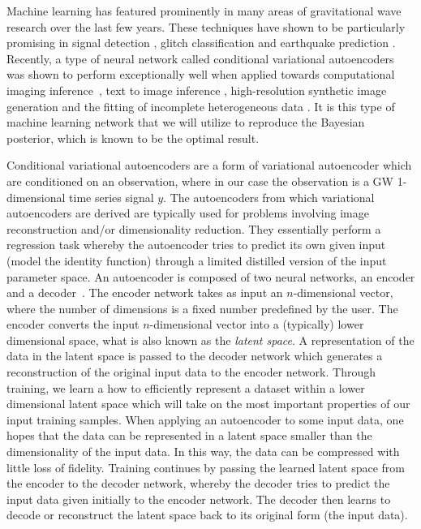 \documentclass[%
showpacs,
 amsmath,amssymb,
 aps,
 twocolumn,
 prl,
 reprint,
floatfix,
]{revtex4-1}
\begin{document}
%
%
Machine learning has featured prominently in many areas of gravitational wave
research over the last few years. These techniques have shown to be
particularly promising in signal detection
\cite{GEORGE201864,PhysRevLett.120.141103,1904.08693}, glitch classification
\cite{1706.07446,0264-9381-34-6-064003} and earthquake prediction
\cite{Coughlin_2017}. Recently, a type of neural network called conditional
variational autoencoders was shown to perform exceptionally well when applied
towards computational imaging inference~\cite{1904.06264,NIPS2015_5775}, text
to image inference \cite{1512.00570}, high-resolution synthetic image
generation \cite{1612.00005} and the fitting of incomplete heterogeneous data
\cite{1807.03653}. It is this type of machine learning network that 
we will utilize to reproduce the Bayesian posterior, which is known to be 
the optimal result.

%
%
Conditional variational autoencoders are a form of variational autoencoder
which are conditioned on an observation, where in our case the observation is a
\ac{GW} 1-dimensional time series signal $y$. The autoencoders from which
variational autoencoders are derived are typically used for problems involving
image reconstruction and/or dimensionality reduction. They essentially perform
a regression task whereby the autoencoder tries to predict its own given input
(model the identity function) through a limited distilled version of the input 
parameter space. An autoencoder is composed of two neural networks, an encoder and a decoder~\cite{LIOU20083150}. The encoder network takes as input an
$n$-dimensional vector, where the number of dimensions is a fixed number
predefined by the user. The encoder converts the input $n$-dimensional vector into a (typically) lower dimensional space, what is also known as the {\it{latent space}}. A
representation of the data in the latent space is passed to the decoder network
which generates a reconstruction of the original input data to the encoder
network. Through training, we learn a how to efficiently represent 
a dataset within a lower dimensional latent space which will take on the most important properties of our input training samples. When applying an autoencoder to some
input data, one hopes that the data can be represented in a latent space
smaller than the dimensionality of the input data.  In this way, the data can
be compressed with little loss of fidelity. Training continues by passing 
the learned latent space from the encoder to the decoder network, 
whereby the decoder tries to predict the input data given initially 
to the encoder network. The decoder then learns to decode or reconstruct the latent space back to its original form (the input data). 
\end{document}
